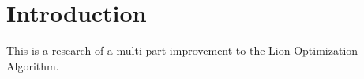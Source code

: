 \section{Introduction}

\par This is a research of a multi-part improvement to the Lion Optimization Algorithm.
